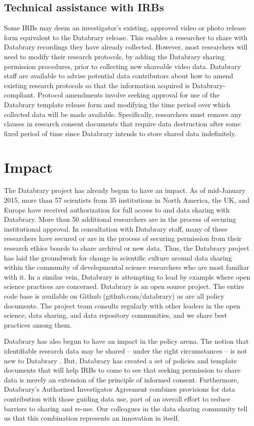 \documentclass{sig-alternate}
\begin{document}
\subsection{Technical assistance with IRBs}

Some IRBs may deem an investigator’s existing, approved video or photo
release form equivalent to the Databrary release. This enables a
researcher to share with Databrary recordings they have already
collected. However, most researchers will need to modify their research
protocols, by adding the Databrary sharing permission procedures, prior
to collecting new shareable video data. Databrary staff are available to
advise potential data contributors about how to amend existing research
protocols so that the information acquired is Databrary-compliant.
Protocol amendments involve seeking approval for use of the Databrary
template release form and modifying the time period over which collected
data will be made available. Specifically, researchers must remove any
clauses in research consent documents that require data destruction
after some fixed period of time since Databrary intends to store shared
data indefinitely.

\section{Impact}

The Databrary project has already begun to have an impact. As of
mid-January 2015, more than 57 scientists from 35 institutions in North
America, the UK, and Europe have received authorization for full access
to and data sharing with Databrary. More than 50 additional researchers
are in the process of securing institutional approval. In consultation
with Databrary staff, many of these researchers have secured or are in
the process of securing permission from their research ethics boards to
share archival or new data. Thus, the Databrary project has laid the
groundwork for change in scientific culture around data sharing within
the community of developmental science researchers who are most familiar
with it. In a similar vein, Databrary is attempting to lead by example
where open science practices are concerned. Databrary is an open source
project. The entire code base is available on Github
(github.com/databrary) as are all policy documents. The project team
consults regularly with other leaders in the open science, data sharing,
and data repository communities, and we share best practices among them.

Databrary has also begun to have an impact in the policy arena. The
notion that identifiable research data may be shared – under the right
circumstances – is not new to Databrary \cite{HCP,PGP}. But, Databrary has
created a set of policies and template documents that will help IRBs to
come to see that seeking permission to share data is merely an extension
of the principle of informed consent. Furthermore, Databrary’s
Authorized Investigator Agreement combines provisions for data
contribution with those guiding data use, part of an overall effort to
reduce barriers to sharing and re-use. Our colleagues in the data
sharing community tell us that this combination represents an innovation
in itself.
\end{document}
